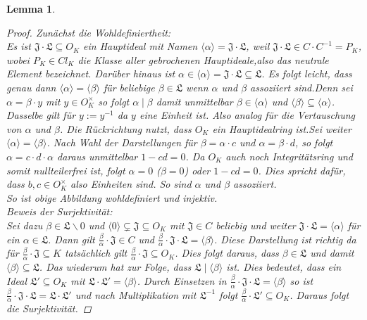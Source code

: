 \documentclass[10pt,a4paper]{article}
\theoremstyle{plain}
\newtheorem{lem}[thm]{Lemma}
\theoremstyle{definition}
\theoremstyle{remark}
\begin{document}
\begin{lem}
\begin{proof}
Zunächst die Wohldefiniertheit:
\\
Es ist $\mathfrak{J\cdot L}\subseteq O_K$ ein Hauptideal mit Namen $\langle \alpha \rangle=\mathfrak{J\cdot L}$, weil $\mathfrak{J\cdot L} \in C\cdot C^{-1} = P_K$, wobei $P_K \in Cl_K$ die Klasse aller gebrochenen Hauptideale,also das neutrale Element bezeichnet. Darüber hinaus ist $\alpha \in \langle \alpha \rangle=\mathfrak{J\cdot L}\subseteq \mathfrak{L}$. Es folgt leicht, dass genau dann $\langle \alpha \rangle=\langle \beta \rangle$ für beliebige $\beta \in \mathfrak{L}$ wenn $\alpha$ und $\beta$ assoziiert sind.Denn sei $\alpha=\beta \cdot y$ mit $y \in O_K^{\times}$ so folgt $\alpha \mid \beta$ damit unmittelbar $\beta \in \langle \alpha \rangle$ und $\langle \beta \rangle  \subseteq \langle \alpha \rangle$. Dasselbe gilt für $y:= y^{-1}$ da $y$ eine Einheit ist. Also analog für die Vertauschung von $\alpha$ und $\beta$. Die Rückrichtung nutzt, dass $O_K$ ein Hauptidealring ist.Sei weiter $\langle \alpha \rangle=\langle \beta \rangle$. Nach Wahl der Darstellungen für $\beta=\alpha\cdot c$ und $\alpha=\beta\cdot d$, so folgt $\alpha=c\cdot d \cdot \alpha$ daraus unmittelbar $1-cd=0$. Da $O_K$ auch noch Integritätsring und somit nullteilerfrei ist, folgt $\alpha=0$  ($\beta =0$) oder $1-cd=0$. Dies spricht dafür, dass $b,c \in O_K^{\times}$ also Einheiten sind. So sind $\alpha$ und $\beta$ assoziiert.
\\
So ist obige Abbildung wohldefiniert und injektiv.
\\
Beweis der Surjektivität:
\\
Sei dazu $\beta \in \mathfrak{L}\backslash{0}$ und  $\langle 0 \rangle \subsetneq \mathfrak{J} \subseteq O_K$ mit $\mathfrak{J} \in C$ beliebig und weiter $\mathfrak{J\cdot L}= \langle \alpha \rangle$ für ein $\alpha \in \mathfrak{L}$. Dann gilt $\frac{\beta}{\alpha} \cdot \mathfrak{J} \in C$ und $\frac{\beta}{\alpha} \cdot \mathfrak{J\cdot L} = \langle \beta\rangle$. Diese Darstellung ist richtig da für $\frac{\beta}{\alpha} \cdot \mathfrak{J} \subseteq K$ tatsächlich gilt $\frac{\beta}{\alpha} \cdot \mathfrak{J} \subseteq O_K$. Dies folgt daraus, dass $\beta \in \mathfrak{L}$ und damit $\langle \beta \rangle \subseteq \mathfrak{L}$. Das wiederum hat zur Folge, dass $\mathfrak{L}\mid \langle \beta \rangle$ ist. Dies bedeutet, dass ein Ideal $\mathfrak{L'}\subseteq O_K$ mit $\mathfrak{L\cdot L'}= \langle \beta \rangle$. Durch Einsetzen in $\frac{\beta}{\alpha} \cdot \mathfrak{J\cdot L} = \langle \beta\rangle$ so ist $\frac{\beta}{\alpha} \cdot \mathfrak{J\cdot L} = \mathfrak{L \cdot L'} $ und nach Multiplikation mit $\mathfrak{L^{-1}}$ folgt $\frac{\beta}{\alpha} \cdot \mathfrak{L'}\subseteq O_K$. Daraus folgt die Surjektivität.

\end{proof}
\end{lem}
\end{document}
